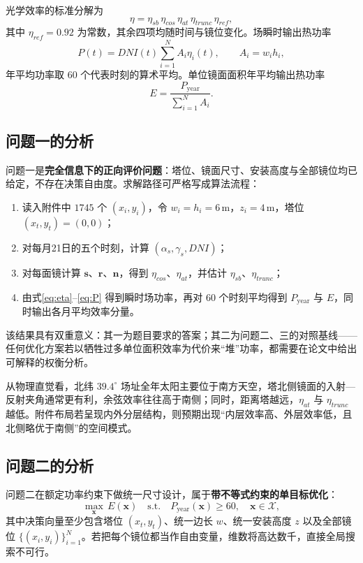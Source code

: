 \documentclass[withoutpreface,bwprint]{cumcmthesis}
\begin{document}
光学效率的标准分解为
\begin{equation}
\eta=\eta_{sb}\,\eta_{cos}\,\eta_{at}\,\eta_{trunc}\,\eta_{ref},
\label{eq:eta}
\end{equation}
其中 $\eta_{ref}=0.92$ 为常数，其余四项均随时间与镜位变化。场瞬时输出热功率
\begin{equation}
P(t)=DNI(t)\sum_{i=1}^{N}A_i\eta_i(t),\qquad A_i=w_ih_i,
\label{eq:P}
\end{equation}
年平均功率取 $60$ 个代表时刻的算术平均。单位镜面面积年平均输出热功率
\begin{equation}
E=\frac{P_{\mathrm{year}}}{\sum_{i=1}^{N}A_i}.
\label{eq:E}
\end{equation}

\subsection{问题一的分析}
问题一是\textbf{完全信息下的正向评价问题}：塔位、镜面尺寸、安装高度与全部镜位均已给定，不存在决策自由度。求解路径可严格写成算法流程：
\begin{enumerate}[leftmargin=2em]
  \item 读入附件中 $1745$ 个 $(x_i,y_i)$，令 $w_i=h_i=6\,\mathrm{m}$，$z_i=4\,\mathrm{m}$，塔位 $(x_t,y_t)=(0,0)$；
  \item 对每月21日的五个时刻，计算 $(\alpha_s,\gamma_s,DNI)$；
  \item 对每面镜计算 $\boldsymbol{s}$、$\boldsymbol{r}$、$\boldsymbol{n}$，得到 $\eta_{cos}$、$\eta_{at}$，并估计 $\eta_{sb}$、$\eta_{trunc}$；
  \item 由式\eqref{eq:eta}--\eqref{eq:P} 得到瞬时场功率，再对 $60$ 个时刻平均得到 $P_{\mathrm{year}}$ 与 $E$，同时输出各月平均效率分量。
\end{enumerate}

该结果具有双重意义：其一为题目要求的答案；其二为问题二、三的对照基线——任何优化方案若以牺牲过多单位面积效率为代价来“堆”功率，都需要在论文中给出可解释的权衡分析。

从物理直觉看，北纬 $39.4^\circ$ 场址全年太阳主要位于南方天空，塔北侧镜面的入射—反射夹角通常更有利，余弦效率往往高于南侧；同时，距离塔越远，$\eta_{at}$ 与 $\eta_{trunc}$ 越低。附件布局若呈现内外分层结构，则预期出现“内层效率高、外层效率低，且北侧略优于南侧”的空间模式。

\subsection{问题二的分析}
问题二在额定功率约束下做统一尺寸设计，属于\textbf{带不等式约束的单目标优化}：
\begin{equation}
\max_{\boldsymbol{x}}\, E(\boldsymbol{x})\quad
\mathrm{s.t.}\quad P_{\mathrm{year}}(\boldsymbol{x})\ge 60,\quad
\boldsymbol{x}\in\mathcal{X},
\label{eq:q2}
\end{equation}
其中决策向量至少包含塔位 $(x_t,y_t)$、统一边长 $w$、统一安装高度 $z$ 以及全部镜位 $\{ (x_i,y_i) \}_{i=1}^{N}$。若把每个镜位都当作自由变量，维数将高达数千，直接全局搜索不可行。
\end{document}
